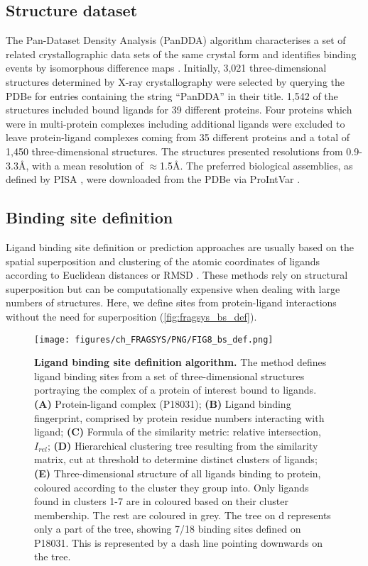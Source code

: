 \subsection{Structure dataset}

The Pan-Dataset Density Analysis (PanDDA) algorithm characterises a set of related crystallographic data sets of the same crystal form and identifies binding events by isomorphous difference maps \cite{PEARCE_2017_PANDDA}.  Initially, 3,021 three-dimensional structures determined by X-ray crystallography were selected by querying the PDBe \cite{wwPDB_2019_PDB} for entries containing the string ``PanDDA'' in their title. 1,542 of the structures included bound ligands for 39 different proteins. Four proteins which were in multi-protein complexes including additional ligands were excluded to leave protein-ligand complexes coming from 35 different proteins and a total of 1,450 three-dimensional structures. The structures presented resolutions from 0.9-3.3\AA{}, with a mean resolution of $\approx$1.5\AA{}. The preferred biological assemblies, as defined by PISA \cite{KRISSINEL_2007_PISA}, were downloaded from the PDBe via ProIntVar \cite{MACGOWAN_2020_DRSASP}. 

\subsection{Binding site definition}

Ligand binding site definition or prediction approaches are usually based on the spatial superposition and clustering of the atomic coordinates of ligands according to Euclidean distances or RMSD \cite{SHIN_2005_PDBLIGAND, KOZAKOV_2005_CLUSTERING, WASS_2010_3DLIGANDSITE, MCGREIG_2022_3DLIGANDSITE}. These methods rely on structural superposition but can be computationally expensive when dealing with large numbers of structures. Here, we define sites from protein-ligand interactions without the need for superposition (\autoref{fig:fragsys_bs_def}).

\begin{figure}[ht!]
    \centering
    \texttt{[image: figures/ch\_FRAGSYS/PNG/FIG8\_bs\_def.png]}
    \caption[Ligand binding site definition algorithm]{\textbf{Ligand binding site definition algorithm.} The method defines ligand binding sites from a set of three-dimensional structures portraying the complex of a protein of interest bound to ligands. \textbf{(A)} Protein-ligand complex (P18031); \textbf{(B)} Ligand binding fingerprint, comprised by protein residue numbers interacting with ligand; \textbf{(C)} Formula of the similarity metric: relative intersection, $I_{rel}$; \textbf{(D)} Hierarchical clustering tree resulting from the similarity matrix, cut at threshold to determine distinct clusters of ligands; \textbf{(E)} Three-dimensional structure of all ligands binding to protein, coloured according to the cluster they group into. Only ligands found in clusters 1-7 are in coloured based on their cluster membership. The rest are coloured in grey. The tree on d represents only a part of the tree, showing 7/18 binding sites defined on P18031. This is represented by a dash line pointing downwards on the tree.}
    \label{fig:fragsys_bs_def}
\end{figure}

